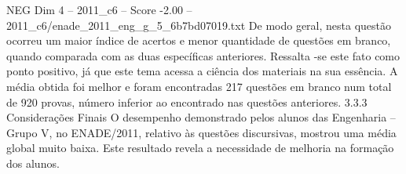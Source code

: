 \begin{textsample}{NEG Dim 4 – 2011\_c6 – Score -2.00 – 2011\_c6/enade\_2011\_eng\_g\_5\_6b7bd07019.txt}
De modo geral, nesta questão ocorreu um maior índice de acertos e menor quantidade de questões em branco, quando comparada com as duas específicas anteriores.
Ressalta -se este fato como ponto positivo, já que este tema acessa a ciência dos materiais na sua essência.
A média obtida foi melhor e foram encontradas 217 questões em branco num total de 920 provas, número inferior ao encontrado nas questões anteriores. 3.3.3 Considerações Finais O desempenho demonstrado pelos alunos das Engenharia – Grupo V, no ENADE/2011, relativo às questões discursivas, mostrou uma média global muito baixa.
Este resultado revela a necessidade de melhoria na formação dos alunos.

\end{textsample}
